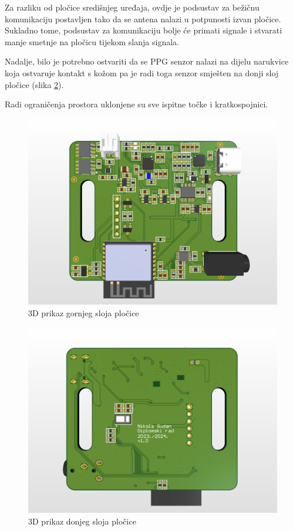 Za razliku od pločice središnjeg uređaja, ovdje je podsustav za bežičnu komunikaciju postavljen tako da se antena nalazi u potpunosti izvan pločice. Sukladno tome, podsustav za komunikaciju bolje će primati signale i stvarati manje smetnje na pločicu tijekom slanja signala.

Nadalje, bilo je potrebno ostvariti da se PPG senzor nalazi na dijelu narukvice koja ostvaruje kontakt s kožom pa je radi toga senzor smješten na donji sloj pločice (slika \ref{slk:BR_PCB_BOT}).

Radi ograničenja prostora uklonjene su sve ispitne točke i kratkospojnici.
\begin{figure}[htb]
    \centering
    \includegraphics[width=10 cm]{Figures/BR_PCB.png}
    \caption{3D prikaz gornjeg sloja pločice}
    \label{slk:BR_PCB_TOP}
\end{figure}
\begin{figure}[htb]
    \centering
    \includegraphics[width=10 cm]{Figures/BR_PCB_BOT.png}
    \caption{3D prikaz donjeg sloja pločice}
    \label{slk:BR_PCB_BOT}
\end{figure}